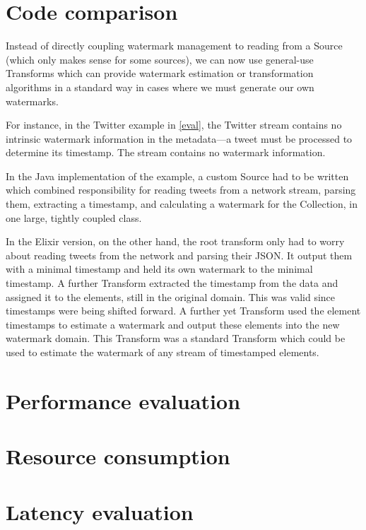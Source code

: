 \section{Code comparison}\label{sec:eval:code}



Instead of directly coupling watermark management to reading from a Source (which only makes sense for some sources), we can now use general-use Transforms which can provide watermark estimation or transformation algorithms in a standard way in cases where we must generate our own watermarks.

For instance, in the Twitter example in \cref{eval}, the Twitter stream contains no intrinsic watermark information in the metadata---a tweet must be processed to determine its timestamp.
The stream contains no watermark information.

In the Java implementation of the example, a custom Source had to be written which combined responsibility for reading tweets from a network stream, parsing them, extracting a timestamp, and calculating a watermark for the Collection, in one large, tightly coupled class.

In the Elixir version, on the other hand, the root transform only had to worry about reading tweets from the network and parsing their JSON.
It output them with a minimal timestamp and held its own watermark to the minimal timestamp.
A further Transform extracted the timestamp from the data and assigned it to the elements, still in the original domain.
This was valid since timestamps were being shifted forward.
A further yet Transform used the element timestamps to estimate a watermark and output these elements into the new watermark domain.
This Transform was a standard Transform which could be used to estimate the watermark of any stream of timestamped elements.


\section{Performance evaluation}\label{sec:eval:performance}

\section{Resource consumption}\label{sec:eval:resource}

\section{Latency evaluation}\label{sec:eval:latency}

